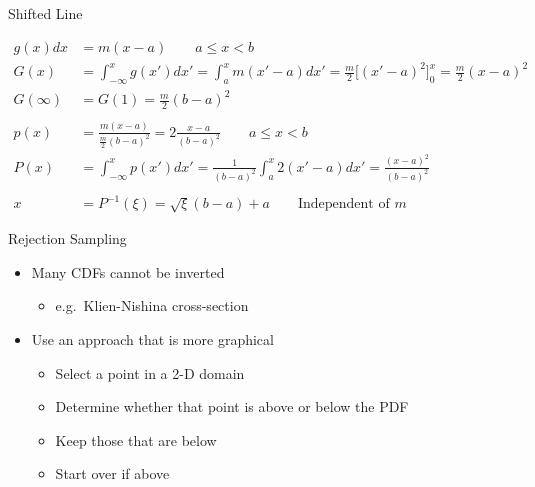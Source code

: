 \documentclass[xcolor=x11names,compress]{beamer}
\renewcommand{\(}{\begin{columns}}
\renewcommand{\)}{\end{columns}}
\newcommand{\<}[1]{\begin{column}{#1}}
\renewcommand{\>}{\end{column}}
\begin{document}
\begin{frame}{Shifted Line}

\[
  \begin{aligned}
  g(x) dx &= m(x - a) \qquad a \leq x < b\\
  G(x) &= \int_{-\infty}^x g(x')dx' = \int_a^x m(x'-a) dx' = \frac{m}{2}\bigl[(x'-a)^2 \bigr]_0^x = \frac{m}{2} (x-a)^2\\
    G(\infty) &= G(1) = \frac{m}{2}(b-a)^2\\
    \\p(x) &= \frac{m(x-a)}{\frac{m}{2}(b-a)^2} = 2 \frac{x-a}{(b-a)^2}\qquad a \leq x < b\\
    P(x) &= \int_{-\infty}^x p(x')dx' = \frac{1}{(b-a)^2}\int_a^x 2(x'-a) dx' = \frac{(x-a)^2}{(b-a)^2}\\
    &\\
    x &= P^{-1}(\xi) = \sqrt{\xi}(b-a) + a \qquad\text{Independent of }m
  \end{aligned}
\]    
    
\end{frame}


\begin{frame}{Rejection Sampling}

    \begin{itemize}
    \item Many CDFs cannot be inverted
      \begin{itemize}
      \item e.g.\ Klien-Nishina cross-section
      \end{itemize}
    \vspace*{1 em}
    \pause
    \item Use an approach that is more graphical
      \begin{itemize}
      \item Select a point in a 2-D domain
      \item Determine whether that point is above or below the PDF
      \item Keep those that are below
      \item Start over if above
      \end{itemize}
    \end{itemize}

\end{frame}
\end{document}

